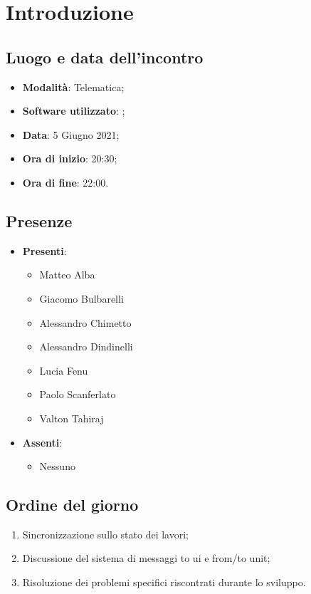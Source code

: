\documentclass[]{article}
\begin{document}
	

	\newpage


		\section{Introduzione}
		\subsection{Luogo e data dell'incontro}
		\begin{itemize}
			\item \textbf{Modalità}: Telematica;
			\item \textbf{Software utilizzato}: ;
			\item \textbf{Data}: 5 Giugno 2021;
			\item \textbf{Ora di inizio}: 20:30;
			\item \textbf{Ora di fine}: 22:00.
		\end{itemize}

		\subsection{Presenze}
		\begin{itemize}
			\item \textbf{Presenti}:
			\begin{itemize}
				\item Matteo Alba
				\item Giacomo Bulbarelli
				\item Alessandro Chimetto
				\item Alessandro Dindinelli
				\item Lucia Fenu
				\item Paolo Scanferlato
				\item Valton Tahiraj
			\end{itemize}
			\item \textbf{Assenti}:
			\begin{itemize}
				\item Nessuno
			\end{itemize}
		\end{itemize}


		\subsection{Ordine del giorno}
		\begin{enumerate}
			\item Sincronizzazione sullo stato dei lavori;
			\item Discussione del sistema di messaggi to ui e from/to unit;
			\item Risoluzione dei problemi specifici riscontrati durante lo sviluppo.
		\end{enumerate}
\end{document}
